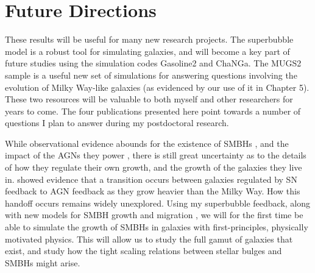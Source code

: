 \section{Future Directions}
These results will be useful for many new research projects.  The superbubble
model is a robust tool for simulating galaxies, and will become a key part of
future studies using the simulation codes {\sc Gasoline2} and {\sc ChaNGa}.  The
MUGS2 sample is a useful new set of simulations for answering questions
involving the evolution of Milky Way-like galaxies (as evidenced by our use of
it in Chapter 5).  These two resources will be valuable to both myself and other
researchers for years to come. The four publications presented here point
towards a number of questions I plan to answer during my postdoctoral research.  

While observational evidence abounds for the existence of SMBHs
\citep{Kormendy2013}, and the impact of the AGNs they power
\citep{Veilleux2005}, there is still great uncertainty as to the details of how
they regulate their own growth, and the growth of the galaxies they live in.
\citet{Keller2016a} showed evidence that a transition occurs between galaxies
regulated by SN feedback to AGN feedback as they grow heavier than the Milky
Way.  How this handoff occurs remains widely unexplored.  Using my superbubble
feedback, along with new models for SMBH growth \citep{Hopkins2010} and
migration \citet{Tremmel2015}, we will for the first time be able to simulate
the growth of SMBHs in galaxies with first-principles, physically motivated
physics.  This will allow us to study the full gamut of galaxies that exist, and
study how the tight scaling relations between stellar bulges and SMBHs might
arise.

